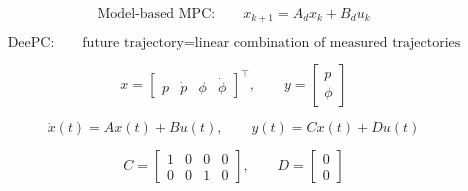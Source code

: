 %

\usepackage{amsmath,amssymb,bm}
\newcommand{\R}{\mathbf{R}}
\newcommand{\Tini}{T_{\mathrm{ini}}}
\newcommand{\Npred}{N}
\newcommand{\Ndata}{N_{\mathrm{data}}}
\newcommand{\Ts}{T_s}
\newcommand{\Hankel}{\mathcal{H}}
\newcommand{\col}{\operatorname{col}}
\newcommand{\rank}{\operatorname{rank}}

%

\[
\text{Model-based MPC:}\qquad
x_{k+1}=A_d x_k+B_d u_k
\]

\[
\text{DeePC:}\qquad
\text{future trajectory}
=
\text{linear combination of measured trajectories}
\]


\[
x=
\begin{bmatrix}
p & \dot p & \phi & \dot \phi
\end{bmatrix}^{\top},
\qquad
y=
\begin{bmatrix}
p\\ \phi
\end{bmatrix}
\]

\[
\dot{x}(t)=Ax(t)+Bu(t),
\qquad
y(t)=Cx(t)+Du(t)
\]

\[
C=
\begin{bmatrix}
1&0&0&0\\
0&0&1&0
\end{bmatrix},
\qquad
D=
\begin{bmatrix}
0\\0
\end{bmatrix}
\]

